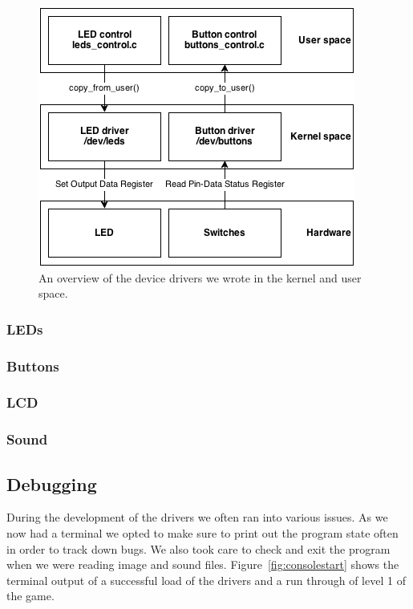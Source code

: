 \documentclass[a4paper,11pt]{article}
\begin{document}
\begin{figure}[H]
\centering
\includegraphics[scale=0.6]{images/devicedrivers.png}
\caption{An overview of the device drivers we wrote in the kernel and user space.}
\label{fig:devicedrivers}
\end{figure}

\subsubsection{LEDs}

\subsubsection{Buttons}

\subsubsection{LCD}
\label{sec:lcd}

\subsubsection{Sound}

\subsection{Debugging}
During the development of the drivers we often ran into various issues. As we now had a terminal we opted to make sure to print out the program state often in order to track down bugs. We also took care to check and exit the program when we were reading image and sound files. Figure~\ref{fig:consolestart} shows the terminal output of a successful load of the drivers and a run through of level 1 of the game.
\end{document}
